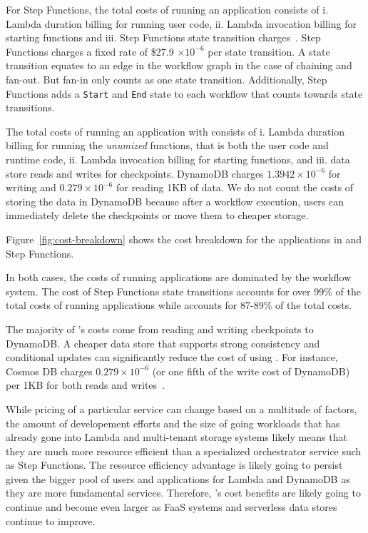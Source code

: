 For Step Functions, the total costs of running an application consists of i.
Lambda duration billing for running user code, ii. Lambda invocation billing
for starting functions and iii. Step Functions state transition
charges~\cite{aws-step-functions-pricing}. Step Functions charges a fixed rate
of \$27.9 $ \times 10^{-6}$ per state transition. A state transition equates
to an edge in the workflow graph in the case of chaining and fan-out. But
fan-in only counts as one state transition. Additionally, Step Functions adds
a \texttt{Start} and \texttt{End} state to each workflow that counts towards
state transitions.

The total costs of running an application with \name{} consists of i. Lambda
duration billing for running the \emph{unumized} functions, that is both the
user code and \name{} runtime code, ii. Lambda invocation billing for starting
functions, and iii. data store reads and writes for checkpoints. DynamoDB
charges $1.3942 \times 10^{-6}$ for writing and $0.279
\times 10^{-6}$ for reading 1KB of data. We do not count the costs of storing
the data in DynamoDB because after a workflow execution, users can immediately
delete the checkpoints or move them to cheaper storage.

Figure~\ref{fig:cost-breakdown} shows the cost breakdown for the applications
in \name{} and Step Functions.


In both cases, the costs of running applications are dominated by the workflow
system. The cost of Step Functions state transitions accounts for over 99\% of
the total costs of running applications while \name{} accounts for 87-89\% of
the total costs.

The majority of \name{}'s costs come from reading and writing checkpoints to
DynamoDB. A cheaper data store that supports strong consistency and
conditional updates can significantly reduce the cost of using \name{}. For
instance, Cosmos DB charges $0.279 \times 10^{-6}$ (or one fifth of the write
cost of DynamoDB) per 1KB for both reads and writes~\cite{cosmosdb-pricing}.

While pricing of a particular service can change based on a multitude of
factors, the amount of developement efforts and the size of going workloads
that has already gone into Lambda and multi-tenant storage systems likely
means that they are much more resource efficient than a specialized
orchestrator service such as Step Functions. The resource efficiency advantage
is likely going to persist given the bigger pool of users and applications for
Lambda and DynamoDB as they are more fundamental services. Therefore,
\name{}'s cost benefits are likely going to continue and become even larger as
FaaS systems and serverless data stores continue to improve.

